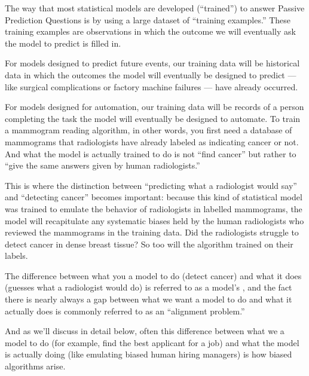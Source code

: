 \documentclass[letterpaper,10pt,english]{jupyterBook}
\begin{document}
\sphinxAtStartPar
The way that most statistical models are developed (“trained”) to answer Passive Prediction Questions is by using a large dataset of “training examples.” These training examples are observations in which the outcome we will eventually ask the model to predict is filled in.

\sphinxAtStartPar
For models designed to predict future events, our training data will be historical data in which the outcomes the model will eventually be designed to predict — like surgical complications or factory machine failures — have already occurred.

\sphinxAtStartPar
For models designed for automation, our training data will be records of a person completing the task the model will eventually be designed to automate. To train a mammogram reading algorithm, in other words, you first need a database of mammograms that radiologists have already labeled as indicating cancer or not. And what the model is actually trained to do is not “find cancer” but rather to “give the same answers given by human radiologists.”

\sphinxAtStartPar
This is where the distinction between “predicting what a radiologist would say” and “detecting cancer” becomes important: because this kind of statistical model was trained to emulate the behavior of radiologists in labelled mammograms, the model will recapitulate any systematic biases held by the human radiologists who reviewed the mammograms in the training data. Did the radiologists struggle to detect cancer in dense breast tissue? So too will the algorithm trained on their labels.

\sphinxAtStartPar
The difference between what you  a model to do (detect cancer) and what it  does (guesses what a radiologist would do) is referred to as a model’s , and the fact there is nearly always a gap between what we want a model to do and what it actually does is commonly referred to as an “alignment problem.”

\sphinxAtStartPar
And as we’ll discuss in detail below, often this difference between what we  a model to do (for example, find the best applicant for a job) and what the model is actually doing (like emulating biased human hiring managers) is how biased algorithms arise.
\end{document}
